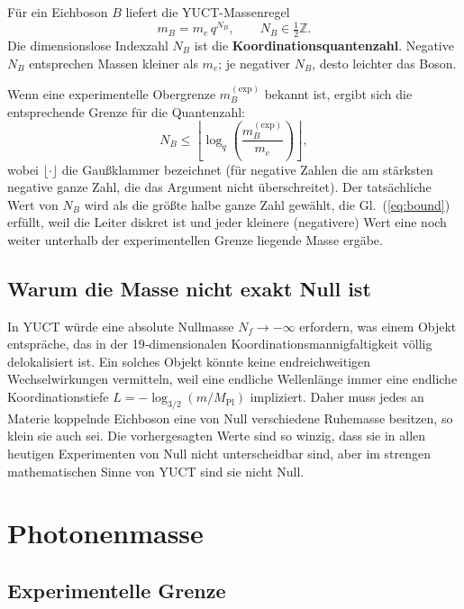 \documentclass[12pt,a4paper]{article}
\newcommand{\Mpl}{M_{\mathrm{Pl}}}
\begin{document}
	Für ein Eichboson $B$ liefert die YUCT-Massenregel
	\begin{equation}\label{eq:bosonmass}
		m_B = m_e \, q^{N_B}, \qquad N_B \in \tfrac12\mathbb{Z}.
	\end{equation}
	Die dimensionslose Indexzahl $N_B$ ist die \textbf{Koordinationsquantenzahl}. Negative $N_B$ entsprechen
	Massen kleiner als $m_e$; je negativer $N_B$, desto leichter das Boson.
	
	Wenn eine experimentelle Obergrenze $m_B^{\mathrm{(exp)}}$ bekannt ist, ergibt sich die entsprechende Grenze
	für die Quantenzahl:
	\begin{equation}\label{eq:bound}
		N_B \le \left\lfloor \log_q\!\left( \frac{m_B^{\mathrm{(exp)}}}{m_e} \right) \right\rfloor ,
	\end{equation}
	wobei $\lfloor\cdot\rfloor$ die Gaußklammer bezeichnet (für negative Zahlen die am stärksten negative ganze Zahl,
	die das Argument nicht überschreitet). Der tatsächliche Wert von $N_B$ wird als die größte halbe ganze Zahl
	gewählt, die Gl.~(\ref{eq:bound}) erfüllt, weil die Leiter diskret ist und jeder kleinere (negativere) Wert
	eine noch weiter unterhalb der experimentellen Grenze liegende Masse ergäbe.
	
	\subsection{Warum die Masse nicht exakt Null ist}
	
	In YUCT würde eine absolute Nullmasse $N_f \to -\infty$ erfordern, was einem Objekt entspräche, das in der
	19‑dimensionalen Koordinationsmannigfaltigkeit völlig delokalisiert ist. Ein solches Objekt könnte keine
	endreichweitigen Wechselwirkungen vermitteln, weil eine endliche Wellenlänge immer eine endliche Koordinationstiefe
	$L = -\log_{3/2}(m/\Mpl)$ impliziert. Daher muss jedes an Materie koppelnde Eichboson eine von Null verschiedene
	Ruhemasse besitzen, so klein sie auch sei. Die vorhergesagten Werte sind so winzig, dass sie in allen heutigen
	Experimenten von Null nicht unterscheidbar sind, aber im strengen mathematischen Sinne von YUCT sind sie nicht Null.
	
	\section{Photonenmasse}
	
	\subsection{Experimentelle Grenze}
	
\end{document}

